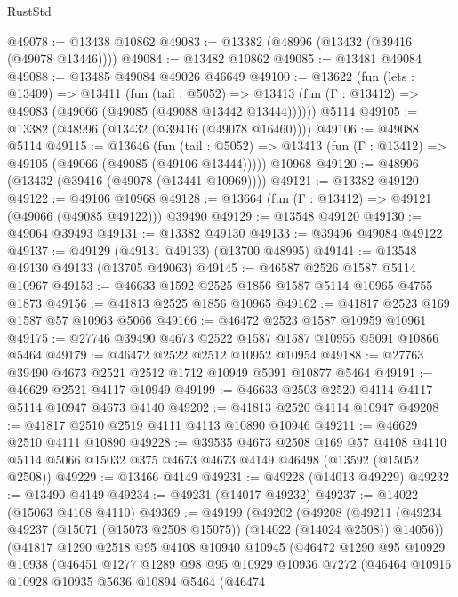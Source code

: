 \begin{lexlean}{RustStd}
\begin{coremodule}
@49078 := @13438 @10862
@49083 := @13382 (@48996 (@13432 (@39416 (@49078 @13446))))
@49084 := @13482 @10862
@49085 := @13481 @49084
@49088 := @13485 @49084 @49026 @46649
@49100 := @13622
    (fun (lets : @13409) =>
    @13411
      (fun (tail : @5052) =>
      @13413 (fun (Γ : @13412) => @49083 (@49066 (@49085 (@49088 @13442 @13444))))))
    @5114
@49105 := @13382 (@48996 (@13432 (@39416 (@49078 @16460))))
@49106 := @49088 @5114
@49115 := @13646
    (fun (tail : @5052) => @13413 (fun (Γ : @13412) => @49105 (@49066 (@49085 (@49106 @13444)))))
    @10968
@49120 := @48996 (@13432 (@39416 (@49078 (@13441 @10969))))
@49121 := @13382 @49120
@49122 := @49106 @10968
@49128 := @13664 (fun (Γ : @13412) => @49121 (@49066 (@49085 @49122))) @39490
@49129 := @13548 @49120
@49130 := @49064 @39493
@49131 := @13382 @49130
@49133 := @39496 @49084 @49122
@49137 := @49129 (@49131 @49133) (@13700 @48995)
@49141 := @13548 @49130 @49133 (@13705 @49063)
@49145 := @46587 @2526 @1587 @5114 @10967
@49153 := @46633 @1592 @2525 @1856 @1587 @5114 @10965 @4755 @1873
@49156 := @41813 @2525 @1856 @10965
@49162 := @41817 @2523 @169 @1587 @57 @10963 @5066
@49166 := @46472 @2523 @1587 @10959 @10961
@49175 := @27746 @39490 @4673 @2522 @1587 @1587 @10956 @5091 @10866 @5464
@49179 := @46472 @2522 @2512 @10952 @10954
@49188 := @27763 @39490 @4673 @2521 @2512 @1712 @10949 @5091 @10877 @5464
@49191 := @46629 @2521 @4117 @10949
@49199 := @46633 @2503 @2520 @4114 @4117 @5114 @10947 @4673 @4140
@49202 := @41813 @2520 @4114 @10947
@49208 := @41817 @2510 @2519 @4111 @4113 @10890 @10946
@49211 := @46629 @2510 @4111 @10890
@49228 := @39535
    @4673
    @2508
    @169
    @57
    @4108
    @4110
    @5114
    @5066
    @15032
    @375
    @4673
    @4673
    @4149
    @46498
    (@13592 (@15052 @2508))
@49229 := @13466 @4149
@49231 := @49228 (@14013 @49229)
@49232 := @13490 @4149
@49234 := @49231 (@14017 @49232)
@49237 := @14022 (@15063 @4108 @4110)
@49369 := @49199
    (@49202
      (@49208
        (@49211 (@49234 @49237 (@15071 (@15073 @2508 @15075)) (@14022 (@14024 @2508)) @14056))
        (@41817
          @1290
          @2518
          @95
          @4108
          @10940
          @10945
          (@46472
            @1290
            @95
            @10929
            @10938
            (@46451
              @1277
              @1289
              @98
              @95
              @10929
              @10936
              @7272
              (@46464
                @10916
                @10928
                @10935
                @5636
                @10894
                @5464
                (@46474

\end{coremodule}
\end{lexlean}
